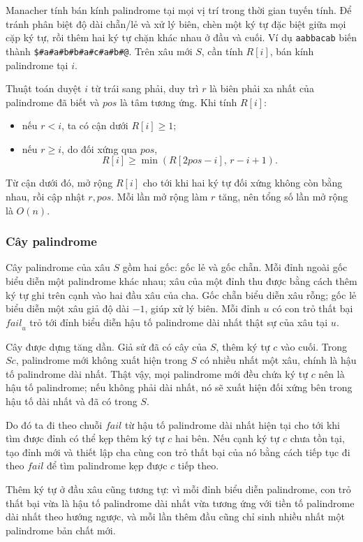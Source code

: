 \documentclass[11pt]{article}
\begin{document}
Manacher tính bán kính palindrome tại mọi vị trí trong thời gian tuyến tính. Để
tránh phân biệt độ dài chẵn/lẻ và xử lý biên, chèn một ký tự đặc biệt giữa mọi
cặp ký tự, rồi thêm hai ký tự chặn khác nhau ở đầu và cuối. Ví dụ
\texttt{aabbacab} biến thành
\texttt{\$\#a\#a\#b\#b\#a\#c\#a\#b\#@}. Trên xâu mới $S$, cần tính $R[i]$,
bán kính palindrome tại $i$.

Thuật toán duyệt $i$ từ trái sang phải, duy trì $r$ là biên phải xa nhất của
palindrome đã biết và $\mathit{pos}$ là tâm tương ứng. Khi tính $R[i]$:
\begin{itemize}
  \item nếu $r<i$, ta có cận dưới $R[i]\ge 1$;
  \item nếu $r\ge i$, do đối xứng qua $\mathit{pos}$,
  \[
    R[i]\ge \min(R[2\mathit{pos}-i],\,r-i+1).
  \]
\end{itemize}
Từ cận dưới đó, mở rộng $R[i]$ cho tới khi hai ký tự đối xứng không còn bằng
nhau, rồi cập nhật $r,\mathit{pos}$. Mỗi lần mở rộng làm $r$ tăng, nên tổng số
lần mở rộng là $O(n)$.

\subsubsection{Cây palindrome}

Cây palindrome của xâu $S$ gồm hai gốc: gốc lẻ và gốc chẵn. Mỗi đỉnh ngoài gốc
biểu diễn một palindrome khác nhau; xâu của một đỉnh thu được bằng cách thêm ký
tự ghi trên cạnh vào hai đầu xâu của cha. Gốc chẵn biểu diễn xâu rỗng; gốc lẻ
biểu diễn một xâu giả độ dài $-1$, giúp xử lý biên. Mỗi đỉnh $u$ có con trỏ
thất bại $\mathit{fail}_u$ trỏ tới đỉnh biểu diễn hậu tố palindrome dài nhất
thật sự của xâu tại $u$.

Cây được dựng tăng dần. Giả sử đã có cây của $S$, thêm ký tự $c$ vào cuối. Trong
$Sc$, palindrome mới không xuất hiện trong $S$ có nhiều nhất một xâu, chính là
hậu tố palindrome dài nhất. Thật vậy, mọi palindrome mới đều chứa ký tự $c$ nên
là hậu tố palindrome; nếu không phải dài nhất, nó sẽ xuất hiện đối xứng bên
trong hậu tố dài nhất và đã có trong $S$.

Do đó ta đi theo chuỗi $\mathit{fail}$ từ hậu tố palindrome dài nhất hiện tại
cho tới khi tìm được đỉnh có thể kẹp thêm ký tự $c$ hai bên. Nếu cạnh ký tự $c$
chưa tồn tại, tạo đỉnh mới và thiết lập cha cùng con trỏ thất bại của nó bằng
cách tiếp tục đi theo $\mathit{fail}$ để tìm palindrome kẹp được $c$ tiếp theo.

Thêm ký tự ở đầu xâu cũng tương tự: vì mỗi đỉnh biểu diễn palindrome, con trỏ
thất bại vừa là hậu tố palindrome dài nhất vừa tương ứng với tiền tố palindrome
dài nhất theo hướng ngược, và mỗi lần thêm đầu cũng chỉ sinh nhiều nhất một
palindrome bản chất mới.
\end{document}
